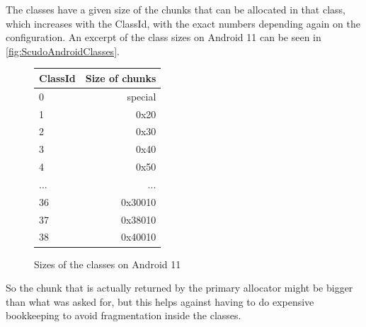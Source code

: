 \documentclass[a4paper,11pt,oneside]{report}
\begin{document}
The classes have a given size of the chunks that can be allocated in that class,
which increases with the ClassId, with the exact numbers depending again on the
configuration. An excerpt of the class sizes on Android 11 can be seen in
\autoref{fig:ScudoAndroidClasses}.

\begin{figure}[h!]
  \centering
  \begin{tabular}{l|r}
    \textbf{ClassId} & \textbf{Size of chunks} \\
    \hline
    0                & special                 \\
    1                & 0x20                    \\
    2                & 0x30                    \\
    3                & 0x40                    \\
    4                & 0x50                    \\
    ...              & ...                     \\
    36               & 0x30010                 \\
    37               & 0x38010                 \\
    38               & 0x40010                
  \end{tabular}
  \caption{Sizes of the classes on Android 11}
  \label{fig:ScudoAndroidClasses}
\end{figure}

So the chunk that is actually returned by the primary allocator might be bigger
than what was asked for, but this helps against having to do expensive bookkeeping
to avoid fragmentation inside the classes.
\end{document}

